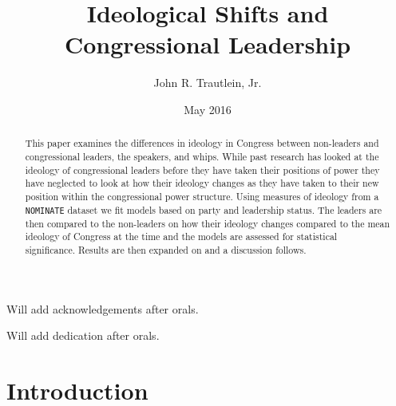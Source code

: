 \documentclass[12pt,twoside]{reedthesis}
\title{Ideological Shifts and Congressional Leadership}
\author{John R. Trautlein, Jr.}
\date{May 2016}
\begin{document}
      \maketitle
  
  \frontmatter %
  \pagestyle{empty} %

      \begin{acknowledgements}
      Will add acknowledgements after orals.
    \end{acknowledgements}
  
  

      \hypersetup{linkcolor=black}
    \setcounter{tocdepth}{2}
    \tableofcontents
  
      \listoftables
  
      \listoffigures
  
      \begin{abstract}
      This paper examines the differences in ideology in Congress between
      non-leaders and congressional leaders, the speakers, and whips. While
      past research has looked at the ideology of congressional leaders before
      they have taken their positions of power they have neglected to look at
      how their ideology changes as they have taken to their new position
      within the congressional power structure. Using measures of ideology
      from a \texttt{NOMINATE} dataset we fit models based on party and
      leadership status. The leaders are then compared to the non-leaders on
      how their ideology changes compared to the mean ideology of Congress at
      the time and the models are assessed for statistical significance.
      Results are then expanded on and a discussion follows.
    \end{abstract}
  
      \begin{dedication}
      Will add dedication after orals.
    \end{dedication}
  
  \mainmatter %
  \pagestyle{fancyplain} %

  \doublespacing
  
  \chapter*{Introduction}\label{introduction}
  
\end{document}
